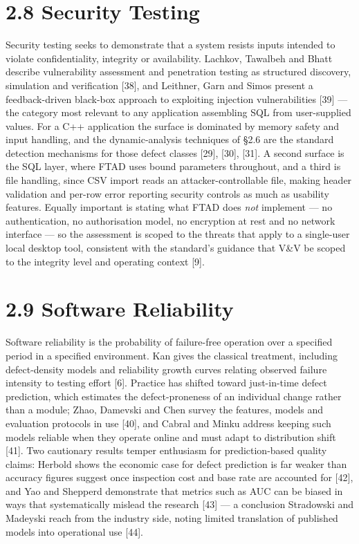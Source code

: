 \documentclass[
  12pt,
]{report}
\begin{document}
\section{2.8 Security Testing}\label{security-testing}

Security testing seeks to demonstrate that a system resists inputs
intended to violate confidentiality, integrity or availability. Lachkov,
Tawalbeh and Bhatt describe vulnerability assessment and penetration
testing as structured discovery, simulation and verification {[}38{]},
and Leithner, Garn and Simos present a feedback-driven black-box
approach to exploiting injection vulnerabilities {[}39{]} --- the
category most relevant to any application assembling SQL from
user-supplied values. For a C++ application the surface is dominated by
memory safety and input handling, and the dynamic-analysis techniques of
§2.6 are the standard detection mechanisms for those defect classes
{[}29{]}, {[}30{]}, {[}31{]}. A second surface is the SQL layer, where
FTAD uses bound parameters throughout, and a third is file handling,
since CSV import reads an attacker-controllable file, making header
validation and per-row error reporting security controls as much as
usability features. Equally important is stating what FTAD does
\emph{not} implement --- no authentication, no authorisation model, no
encryption at rest and no network interface --- so the assessment is
scoped to the threats that apply to a single-user local desktop tool,
consistent with the standard's guidance that V\&V be scoped to the
integrity level and operating context {[}9{]}.

\section{2.9 Software Reliability}\label{software-reliability}

Software reliability is the probability of failure-free operation over a
specified period in a specified environment. Kan gives the classical
treatment, including defect-density models and reliability growth curves
relating observed failure intensity to testing effort {[}6{]}. Practice
has shifted toward just-in-time defect prediction, which estimates the
defect-proneness of an individual change rather than a module; Zhao,
Damevski and Chen survey the features, models and evaluation protocols
in use {[}40{]}, and Cabral and Minku address keeping such models
reliable when they operate online and must adapt to distribution shift
{[}41{]}. Two cautionary results temper enthusiasm for prediction-based
quality claims: Herbold shows the economic case for defect prediction is
far weaker than accuracy figures suggest once inspection cost and base
rate are accounted for {[}42{]}, and Yao and Shepperd demonstrate that
metrics such as AUC can be biased in ways that systematically mislead
the research {[}43{]} --- a conclusion Stradowski and Madeyski reach
from the industry side, noting limited translation of published models
into operational use {[}44{]}.
\end{document}

